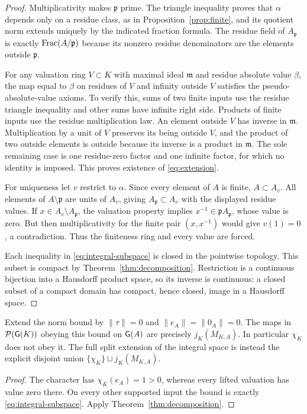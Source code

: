 \begin{proof}
Multiplicativity makes $\mathfrak p$ prime. The triangle inequality proves
that $\alpha$ depends only on a residue class, as in
Proposition~\ref{prop:finite}, and its quotient norm extends uniquely by
the indicated fraction formula. The residue field of $A_{\mathfrak p}$
is exactly $\operatorname{Frac}(A/\mathfrak p)$ because its nonzero residue denominators
are the elements outside $\mathfrak p$.

For any valuation ring $V\subset K$ with maximal ideal $\mathfrak m$
and residue absolute value $\beta$, the map equal to $\beta$ on residues
of $V$ and infinity outside $V$ satisfies the pseudo-absolute-value
axioms. To verify this, sums of two finite inputs use the residue triangle
inequality and other sums have infinite right side. Products of finite
inputs use the residue multiplication law. An element outside $V$ has
inverse in $\mathfrak m$. Multiplication by a unit of $V$ preserves its
being outside $V$, and the product of two outside elements is outside
because its inverse is a product in $\mathfrak m$. The sole remaining
case is one residue-zero factor and one infinite factor, for which no
identity is imposed. This proves existence of \eqref{eq:extension}.

For uniqueness let $v$ restrict to $\alpha$. Since every element of $A$
is finite, $A\subset A_v$. All elements of $A\setminus\mathfrak p$ are
units of $A_v$, giving $A_{\mathfrak p}\subset A_v$ with the displayed
residue values. If $x\in A_v\setminus A_{\mathfrak p}$, the valuation
property implies $x^{-1}\in\mathfrak p A_{\mathfrak p}$, whose value is
zero. But then multiplicativity for the finite pair $(x,x^{-1})$ would
give $v(1)=0$, a contradiction. Thus the finiteness ring and every value
are forced.

Each inequality in \eqref{eq:integral-subspace} is closed in the pointwise
topology. This subset is compact by Theorem~\ref{thm:decomposition}.
Restriction is a continuous bijection into a Hausdorff product space,
so its inverse is continuous: a closed subset of a compact domain has
compact, hence closed, image in a Hausdorff space.
\end{proof}

\begin{corollary}
Extend the norm bound by $\|\tau\|=0$ and
$\|e_A\|=\|0_A\|=0$. The maps in $\mathcal P(\mathsf G(K))$ obeying this bound
on $\mathsf G(A)$ are precisely $j_K(M_{K,A})$. In particular $\chi_K$ does not
obey it. The full split extension of the integral space is instead the
explicit disjoint union $\{\chi_K\}\sqcup j_K(M_{K,A})$.
\end{corollary}
\begin{proof}
The character has $\chi_K(e_A)=1>0$, whereas every lifted valuation has
value zero there. On every other supported input the bound is exactly
\eqref{eq:integral-subspace}. Apply Theorem~\ref{thm:decomposition}.
\end{proof}

